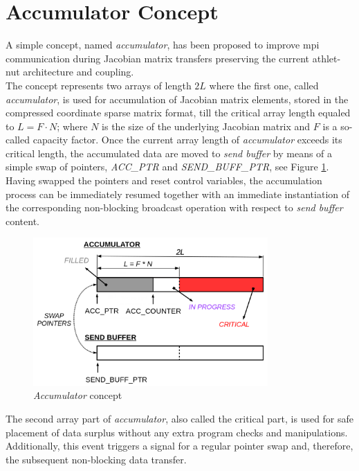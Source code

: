 \section{Accumulator Concept}
\label{sec:accumulator-approach}



A simple concept, named \textit{accumulator}, has been proposed to improve \acrshort{mpi} communication during Jacobian matrix transfers preserving the current \acrshort{athlet}-\acrshort{nut} architecture and coupling.\\


The concept represents two arrays of length $2L$ where the first one, called \textit{accumulator}, is used for accumulation of Jacobian matrix elements, stored in the compressed coordinate sparse matrix format, till the critical array length equaled to $L = F \cdot N$; where $N$ is the size of the underlying Jacobian matrix and $F$ is a so-called capacity factor. Once the current array length of \textit{accumulator} exceeds its critical length, the accumulated data are moved to \textit{send buffer} by means of a simple swap of pointers, \textit{ACC\_PTR} and \textit{SEND\_BUFF\_PTR}, see Figure \ref{fig:accumulator-concept}. Having swapped the pointers and reset control variables, the accumulation process can be immediately resumed together with an immediate instantiation of the corresponding non-blocking broadcast operation with respect to \textit{send buffer} content.


\begin{figure}[!htpb]
  \centering
  \includegraphics[width=0.8\textwidth]{figures/chapter-3/accumulator-concept.png}
  \caption{\textit{Accumulator} concept} \label{fig:accumulator-concept}
\end{figure}


The second array part of \textit{accumulator}, also called the critical part, is used for safe placement of data surplus without any extra program checks and manipulations. Additionally, this event triggers a signal for a regular pointer swap and, therefore, the subsequent non-blocking data transfer.\\


